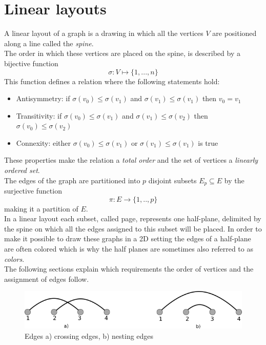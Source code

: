 \section{Linear layouts}
\label{LL}
A linear layout of a graph is a drawing in which all the vertices $V$ are positioned along a line called the \textit{spine}.\\
The order in which these vertices are placed on the spine, is described by a bijective function $$\sigma : V \mapsto \{1,...,n\} $$ This function defines a relation where the following statements hold:
\begin{itemize}
\item Antisymmetry: if $\sigma(v_0) \leq \sigma(v_1)$ and $\sigma(v_1) \leq \sigma(v_1)$ then $v_0 = v_1$
\item Transitivity: if $\sigma(v_0) \leq \sigma(v_1)$ and $\sigma(v_1) \leq \sigma(v_2)$ then $\sigma(v_0) \leq \sigma(v_2)$
\item Connexity: either $\sigma(v_0) \leq \sigma(v_1)$ or $\sigma(v_1) \leq \sigma(v_1)$ is true
\end{itemize}
These properties make the relation a \textit{total order} and the set of vertices a \textit{linearly ordered set}.\\
The edges of the graph are partitioned into $p$ disjoint subsets $E_p \subseteq E$ by the surjective function 
$$ \pi: E \rightarrow \{1,..,p\} $$ making it a partition of $E$.\\
In a linear layout each subset, called page, represents one half-plane, delimited by the spine on which all the edges assigned to this subset will be placed.
In order to make it possible to draw these graphs in a 2D setting the edges of a half-plane are often colored which is why the half planes are sometimes also referred to as \textit{colors}.\\
The following sections explain which requirements the order of vertices and the assignment of edges follow.
\begin{figure}[!h]
\begin{center}
\includegraphics[width=1\textwidth]{figures/CrossingNesting.png}
\caption{Edges a) crossing edges, b) nesting edges}
\label{img:crossNest}
\end{center}
\end{figure}
